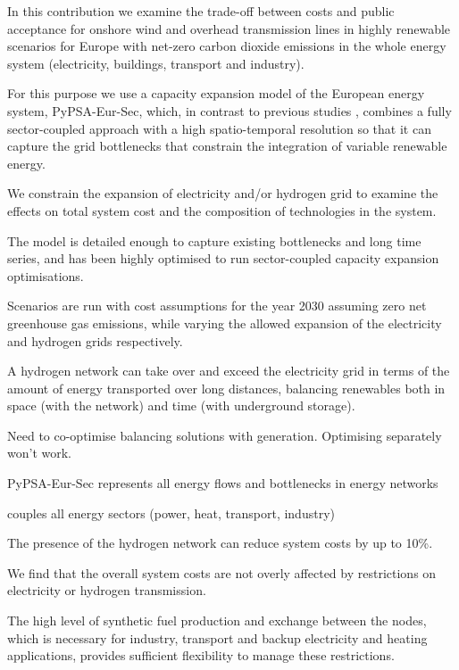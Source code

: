 In this contribution we examine the trade-off between costs and public
acceptance for onshore wind and overhead transmission lines in highly
renewable scenarios for Europe with net-zero carbon dioxide emissions
in the whole energy system (electricity, buildings, transport and
industry).

For this purpose we use a capacity expansion model of the European energy
system, PyPSA-Eur-Sec, which, in contrast to previous studies
\cite{henningComprehensiveModel2014,mathiesenSmartEnergy2015,IEESWV,connollySmartEnergy2016,lofflerDesigningModel2017,blancoPotentialHydrogen2018,brownSynergiesSector2018,in-depth_2018,victoria2020},
combines a fully sector-coupled approach with a high spatio-temporal resolution
so that it can capture the grid bottlenecks that constrain the integration of
variable renewable energy.

We constrain the expansion of electricity and/or hydrogen grid to examine the
effects on total system cost and the composition of technologies in the system.

The model is detailed enough to capture existing
bottlenecks and long time series, and has been highly optimised to run
sector-coupled capacity expansion optimisations.

Scenarios are run with cost
assumptions for the year 2030 assuming zero net greenhouse gas emissions, while
varying the allowed expansion of the electricity and hydrogen grids
respectively.

A hydrogen network can take over and exceed the electricity grid
in terms of the amount of energy transported over long distances, balancing
renewables both in space (with the network) and time (with underground storage).

Need to co-optimise balancing solutions with generation. Optimising separately won't work.

PyPSA-Eur-Sec represents all energy flows and bottlenecks in energy networks

couples all energy sectors (power, heat, transport, industry)


The presence of the hydrogen network can reduce system costs by up to 10\%.

We find that the overall system costs are not overly affected
by restrictions on electricity or hydrogen transmission.

The high level of synthetic fuel production and exchange between the nodes, which is
necessary for industry, transport and backup electricity and heating
applications, provides sufficient flexibility to manage these
restrictions.

